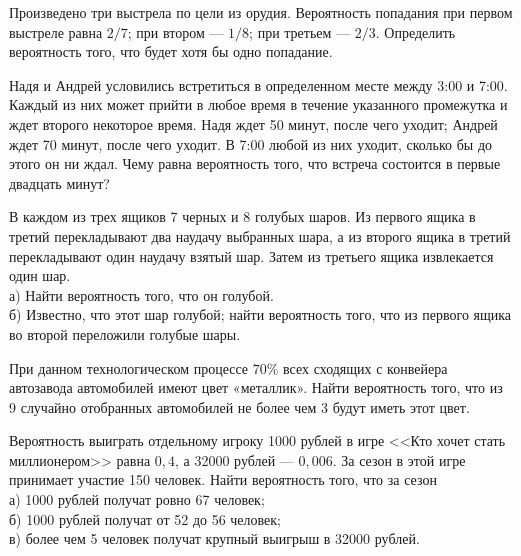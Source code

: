 \newpage\setcounter{zad}{0}



\begin{zkrW}{20}\noindent 
	Произведено три выстрела по цели из орудия. Вероятность попадания при первом выстреле равна $2/7$; при втором --- $1/8$; при третьем --- $2/3$. Определить вероятность того, что будет хотя бы одно попадание.
 
\end{zkrW}

\begin{zkrW}{20}\noindent 
	Надя и Андрей условились встретиться в определенном месте между 3:00 и 7:00. Каждый из них может прийти в любое время в течение указанного промежутка и ждет второго некоторое время. Надя ждет 50 минут, после чего уходит; Андрей ждет 70 минут, после чего уходит. В 7:00 любой из них уходит, сколько бы до этого он ни ждал. Чему равна вероятность того, что встреча состоится в первые двадцать минут?
 
\end{zkrW}

\begin{zkrW}{20}\noindent 
	В каждом из трех ящиков 7 черных и 8 голубых шаров. Из первого ящика в третий перекладывают два наудачу выбранных шара, а из второго ящика в третий перекладывают один наудачу взятый шар. Затем из третьего ящика извлекается один шар. \\ \indent а) Найти вероятность того, что он голубой. \\ \indent б) Известно, что этот шар голубой; найти вероятность того, что из первого ящика во второй переложили голубые шары.
 
\end{zkrW}

\begin{zkrW}{20}\noindent 
	При данном технологическом процессе $70\%$ всех сходящих с конвейера автозавода автомобилей имеют цвет «металлик». Найти вероятность того, что из 9 случайно отобранных автомобилей не более чем 3 будут иметь этот цвет.
 
\end{zkrW}

\begin{zkrW}{20}\noindent 
	Вероятность выиграть отдельному игроку 1000 рублей в игре <<Кто хочет стать миллионером>> равна $0{,}4$, а 32000 рублей --- $0{,}006$. За сезон в этой игре принимает участие 150 человек. Найти вероятность того, что за сезон \\ \indent а) 1000 рублей получат ровно 67 человек; \\ \indent б) 1000 рублей получат от 52 до 56 человек; \\ \indent в) более чем 5 человек получат крупный выигрыш в 32000 рублей.
 
\end{zkrW}

